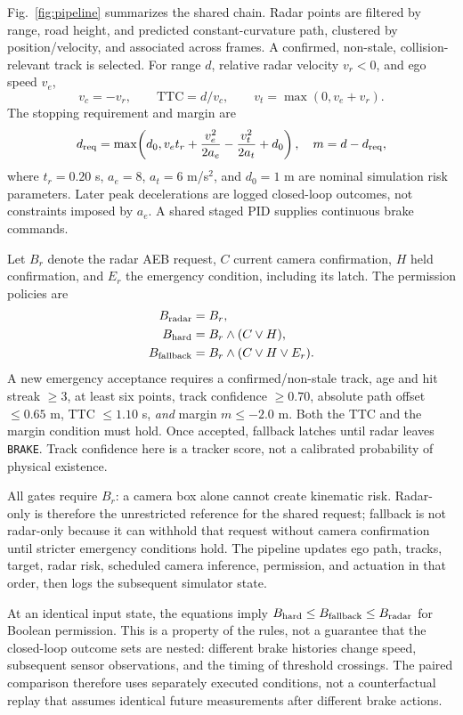 \documentclass[conference]{IEEEtran}
\begin{document}
Fig.~\ref{fig:pipeline} summarizes the shared chain. Radar points are filtered by range, road height, and predicted constant-curvature
path, clustered by position/velocity, and associated across frames. A confirmed,
non-stale, collision-relevant track is selected. For range $d$, relative radar
velocity $v_r<0$, and ego speed $v_e$,
\begin{equation}
v_c=-v_r,\qquad \mathrm{TTC}=d/v_c,\qquad v_t=\max(0,v_e+v_r).
\end{equation}
The stopping requirement and margin are
\begin{equation}
d_{\rm req}=\max\!\left(d_0,v_et_r+\frac{v_e^2}{2a_e}-\frac{v_t^2}{2a_t}+d_0\right),
\quad m=d-d_{\rm req},
\end{equation}
where $t_r=0.20$ s, $a_e=8$, $a_t=6$ m/s$^2$, and $d_0=1$ m are nominal
simulation risk parameters. Later peak decelerations are logged closed-loop
outcomes, not constraints imposed by $a_e$. A shared staged PID supplies
continuous brake commands.

Let $B_r$ denote the radar AEB request, $C$ current camera confirmation, $H$
held confirmation, and $E_r$ the emergency condition, including its latch. The
permission policies are
\begin{align}
 B_{\rm radar}&=B_r,\\
 B_{\rm hard}&=B_r\land(C\lor H),\\
 B_{\rm fallback}&=B_r\land(C\lor H\lor E_r).
\end{align}
A new emergency acceptance requires a confirmed/non-stale track, age and hit
streak $\geq3$, at least six points, track confidence $\geq0.70$, absolute path
offset $\leq0.65$ m, TTC $\leq1.10$ s, \emph{and} margin $m\leq-2.0$ m.
Both the TTC and the margin condition must hold. Once accepted, fallback
latches until radar leaves \texttt{BRAKE}. Track confidence here is a tracker
score, not a calibrated probability of physical existence.

All gates require $B_r$: a camera box alone cannot create kinematic risk.
Radar-only is therefore the unrestricted reference for the shared request;
fallback is not radar-only because it can withhold that request without camera
confirmation until stricter emergency conditions hold. The pipeline updates
ego path, tracks, target, radar risk, scheduled camera inference, permission,
and actuation in that order, then logs the subsequent simulator state.

At an identical input state, the equations imply
$B_{\rm hard}\leq B_{\rm fallback}\leq B_{\rm radar}$ for Boolean permission.
This is a property of the rules, not a guarantee that the closed-loop outcome
sets are nested: different brake histories change speed, subsequent sensor
observations, and the timing of threshold crossings. The paired comparison
therefore uses separately executed conditions, not a counterfactual replay
that assumes identical future measurements after different brake actions.
\end{document}
